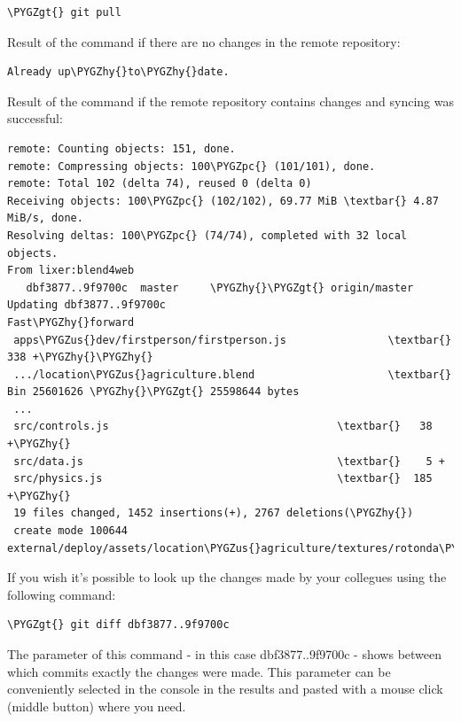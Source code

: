 \documentclass[a4paper,12pt,oneside]{sphinxmanual}
\def\PYGZus{\char`\_}
\def\PYGZgt{\char`\>}
\def\PYGZpc{\char`\%}
\def\PYGZhy{\char`\-}
\begin{document}
\begin{Verbatim}[commandchars=\\\{\}]
\PYGZgt{} git pull
\end{Verbatim}

Result of the  command if there are no changes in the remote repository:

\begin{Verbatim}[commandchars=\\\{\}]
Already up\PYGZhy{}to\PYGZhy{}date.
\end{Verbatim}

Result of the  command if the remote repository contains changes and syncing was successful:

\begin{Verbatim}[commandchars=\\\{\}]
remote: Counting objects: 151, done.
remote: Compressing objects: 100\PYGZpc{} (101/101), done.
remote: Total 102 (delta 74), reused 0 (delta 0)
Receiving objects: 100\PYGZpc{} (102/102), 69.77 MiB \textbar{} 4.87 MiB/s, done.
Resolving deltas: 100\PYGZpc{} (74/74), completed with 32 local objects.
From lixer:blend4web
   dbf3877..9f9700c  master     \PYGZhy{}\PYGZgt{} origin/master
Updating dbf3877..9f9700c
Fast\PYGZhy{}forward
 apps\PYGZus{}dev/firstperson/firstperson.js                \textbar{}  338 +\PYGZhy{}\PYGZhy{}
 .../location\PYGZus{}agriculture.blend                     \textbar{}  Bin 25601626 \PYGZhy{}\PYGZgt{} 25598644 bytes
 ...
 src/controls.js                                    \textbar{}   38 +\PYGZhy{}
 src/data.js                                        \textbar{}    5 +
 src/physics.js                                     \textbar{}  185 +\PYGZhy{}
 19 files changed, 1452 insertions(+), 2767 deletions(\PYGZhy{})
 create mode 100644    external/deploy/assets/location\PYGZus{}agriculture/textures/rotonda\PYGZus{}02\PYGZus{}diff.png
\end{Verbatim}

If you wish it's possible to look up the changes made by your collegues using the following command:

\begin{Verbatim}[commandchars=\\\{\}]
\PYGZgt{} git diff dbf3877..9f9700c
\end{Verbatim}

The parameter of this command - in this case dbf3877..9f9700c - shows between which commits exactly the changes were made. This parameter can be conveniently selected in the console in the  results and pasted with a mouse click (middle button) where you need.
\end{document}
